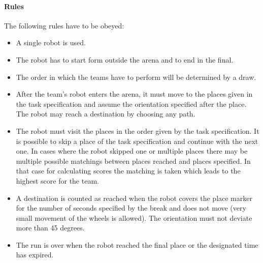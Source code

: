 \paragraph{Rules}
The following rules have to be obeyed:

\begin{itemize}
\item A single robot is used.
\item The robot has to start form outside the arena and to end in the final.
\item The order in which the teams have to perform will be determined by a draw.
\item After the team's robot enters the arena, it must move to the places given in the task specification and assume the orientation specified after the place. The robot may reach a destination by choosing any path.
\item The robot must visit the places in the order given by the task specification. It is possible to skip a place of the task specification and continue with the next one. In cases where the robot skipped one or multiple places there may be multiple possible matchings between places reached and places specified. In that case for calculating scores the matching is taken which leads to the highest score for the team.
\item A destination is counted as reached when the robot covers the place marker for the number of seconds specified by the break and does not move (very small movement of the wheels is allowed). The orientation must not deviate more than 45 degrees.
\item The run is over when the robot reached the final place or the designated time has expired.
\end{itemize}
%
%
%
%
